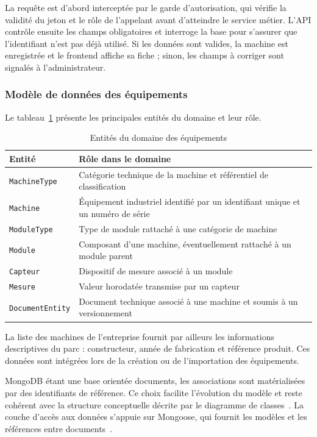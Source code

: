 La requête est d'abord interceptée par le garde d'autorisation, qui vérifie la validité du jeton et le rôle de l'appelant avant d'atteindre le service métier. L'API contrôle ensuite les champs obligatoires et interroge la base pour s'assurer que l'identifiant n'est pas déjà utilisé. Si les données sont valides, la machine est enregistrée et le frontend affiche sa fiche ; sinon, les champs à corriger sont signalés à l'administrateur.

\subsubsection{Modèle de données des équipements}

Le tableau~\ref{tab:modele-equipements} présente les principales entités du domaine et leur rôle.

\begin{table}[H]
\centering
\caption{Entités du domaine des équipements}
\label{tab:modele-equipements}
\small
\begin{tabularx}{\textwidth}{|p{3.1cm}|X|}
\hline
\textbf{Entité} & \textbf{Rôle dans le domaine} \\
\hline
\texttt{MachineType} & Catégorie technique de la machine et référentiel de classification \\
\hline
\texttt{Machine} & Équipement industriel identifié par un identifiant unique et un numéro de série \\
\hline
\texttt{ModuleType} & Type de module rattaché à une catégorie de machine \\
\hline
\texttt{Module} & Composant d'une machine, éventuellement rattaché à un module parent \\
\hline
\texttt{Capteur} & Dispositif de mesure associé à un module \\
\hline
\texttt{Mesure} & Valeur horodatée transmise par un capteur \\
\hline
\texttt{DocumentEntity} & Document technique associé à une machine et soumis à un versionnement \\
\hline
\end{tabularx}
\end{table}

La liste des machines de l'entreprise fournit par ailleurs les informations descriptives du parc : constructeur, année de fabrication et référence produit. Ces données sont intégrées lors de la création ou de l'importation des équipements.

MongoDB étant une base orientée documents, les associations sont matérialisées par des identifiants de référence. Ce choix facilite l'évolution du modèle et reste cohérent avec la structure conceptuelle décrite par le diagramme de classes~\cite{omg_uml,mongodb_atlas_docs}. La couche d'accès aux données s'appuie sur Mongoose, qui fournit les modèles et les références entre documents~\cite{mongoose_docs}.

